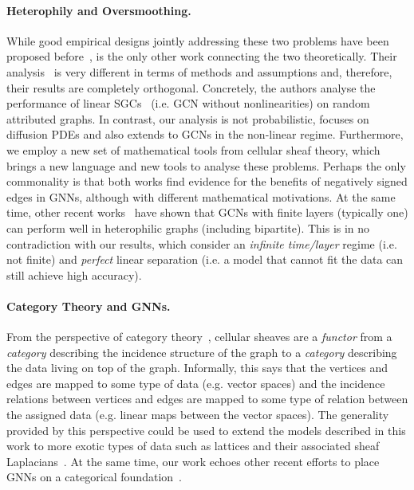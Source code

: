 \documentclass{article}
\begin{document}
\paragraph{Heterophily and Oversmoothing.} While good empirical designs jointly addressing these two problems have been proposed before~\citep{chien2021adaptive, yan2021two}, \citet{yan2021two} is the only other work connecting the two theoretically. Their analysis~\citep{yan2021two} is very different in terms of methods and assumptions and, therefore, their results are completely orthogonal. Concretely, the authors analyse the performance of linear SGCs~\citep{SGC} (i.e. GCN without nonlinearities) on random attributed graphs. In contrast, our analysis is not probabilistic, focuses on diffusion PDEs and also extends to GCNs in the non-linear regime. Furthermore, we employ a new set of mathematical tools from cellular sheaf theory, which brings a new language and new tools to analyse these problems. Perhaps the only commonality is that both works find evidence for the benefits of negatively signed edges in GNNs, although with different mathematical motivations. At the same time, other recent works~\citep{luan2021heterophily, du2022gbk} have shown that GCNs with finite layers (typically one) can perform well in heterophilic graphs (including bipartite). This is in no contradiction with our results, which consider an \emph{infinite time/layer} regime (i.e. not finite) and \emph{perfect} linear separation (i.e. a model that cannot fit the data can still achieve high accuracy).  

\paragraph{Category Theory and GNNs.} From the perspective of category theory~\citep{mac2013categories}, cellular sheaves are a \emph{functor} from a \emph{category} describing the incidence structure of the graph to a \emph{category} describing the data living on top of the graph. Informally, this says that the vertices and edges are mapped to some type of data (e.g. vector spaces) and the incidence relations between vertices and edges are mapped to some type of relation between the assigned data (e.g. linear maps between the vector spaces). The generality provided by this perspective could be used to extend the models described in this work to more exotic types of data such as lattices and their associated sheaf Laplacians~\citep{ghrist2020cellular}. At the same time, our work echoes other recent efforts to place GNNs on a categorical foundation~\citep{de2020natural, dudzik2022graph}. 
\end{document}

